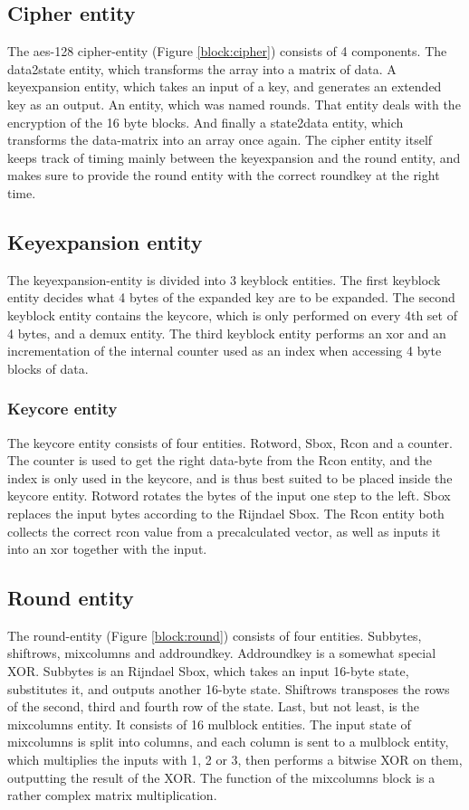 \subsection{Cipher entity}
The aes-128 cipher-entity (Figure \ref{block:cipher}) consists of 4 
components. The data2state entity, which transforms the array into a 
matrix of data. A keyexpansion entity, which takes an input of a key, 
and generates an extended key as an output. An entity, which was named  
rounds. That entity deals with the encryption of the 16 byte blocks. 
And finally a state2data entity, which transforms the data-matrix into 
an array once again. The cipher entity itself keeps track of timing 
mainly between the keyexpansion and the round entity, and makes sure to 
provide the round entity with the correct roundkey at the right time.

\subsection{Keyexpansion entity}
The keyexpansion-entity is divided into 3 keyblock entities. The first 
keyblock entity decides what 4 bytes of the expanded key are to be 
expanded. The second keyblock entity contains the keycore, which is 
only performed on every 4th set of 4 bytes, and a demux entity. The 
third keyblock entity performs an xor and an incrementation of the 
internal counter used as an index when accessing 4 byte blocks of data.

\subsubsection{Keycore entity}
The keycore entity consists of four entities. Rotword, Sbox, Rcon and a 
counter. The counter is used to get the right data-byte from the Rcon 
entity, and the index is only used in the keycore, and is thus best 
suited to be placed inside the keycore entity. Rotword rotates the 
bytes of the input one step to the left. Sbox replaces the input bytes 
according to the Rijndael Sbox. The Rcon entity both collects the 
correct rcon value from a precalculated vector, as well as inputs it 
into an xor together with the input.

\subsection{Round entity}
The round-entity (Figure \ref{block:round}) consists of four entities. 
Subbytes, shiftrows, mixcolumns and addroundkey. Addroundkey is a 
somewhat special XOR. Subbytes is an Rijndael Sbox, which takes an 
input 16-byte state, substitutes it, and outputs another 16-byte state. 
Shiftrows transposes the rows of the second, third and fourth row of 
the state. Last, but not least, is the mixcolumns entity. It consists 
of 16 mulblock entities. The input state of mixcolumns is split into 
columns, and each column is sent to a mulblock entity, which multiplies 
the inputs with 1, 2 or 3, then performs a bitwise XOR on them, 
outputting the result of the XOR. The function of the mixcolumns block 
is a rather complex matrix multiplication.

